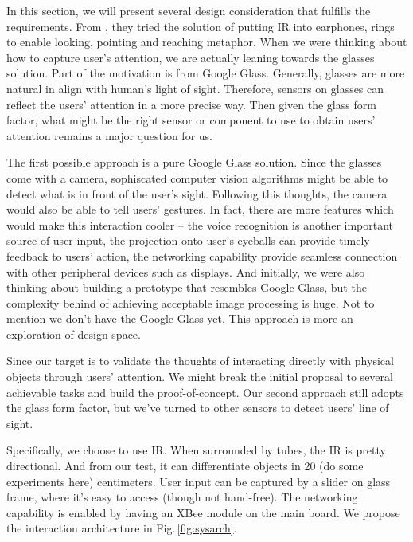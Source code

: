In this section, we will present several design consideration that fulfills the requirements. From \cite{Merrill:2007:ALP:1758156.1758158}, they tried the solution of putting IR into earphones, rings to enable looking, pointing and reaching metaphor. When we were thinking about how to capture user's attention, we are actually leaning towards the glasses solution. Part of the motivation is from Google Glass. Generally, glasses are more natural in align with human's light of sight. Therefore, sensors on glasses can reflect the users' attention in a more precise way. Then given the glass form factor, what might be the right sensor or component to use to obtain users' attention remains a major question for us.

The first possible approach is a pure Google Glass solution. Since the glasses come with a camera, sophiscated computer vision algorithms might be able to detect what is in front of the user's sight. Following this thoughts, the camera would also be able to tell users' gestures. In fact, there are more features which would make this interaction cooler -- the voice recognition is another important source of user input, the projection onto user's eyeballs can provide timely feedback to users' action, the networking capability provide seamless connection with other peripheral devices such as displays. And initially, we were also thinking about building a prototype that resembles Google Glass, but the complexity behind of achieving acceptable image processing is huge. Not to mention we don't have the Google Glass yet. This approach is more an exploration of design space. 

Since our target is to validate the thoughts of interacting directly with physical objects through users' attention. We might break the initial proposal to several achievable tasks and build the proof-of-concept. Our second approach still adopts the glass form factor, but we've turned to other sensors to detect users' line of sight. 

Specifically, we choose to use IR. When surrounded by tubes, the IR is pretty directional. And from our test, it can differentiate objects in {\color{red} 20 (do some experiments here)} centimeters. User input can be captured by a slider on glass frame, where it's easy to access (though not hand-free). The networking capability is enabled by having an XBee module on the main board. We propose the interaction architecture in Fig.\,\ref{fig:sysarch}.


